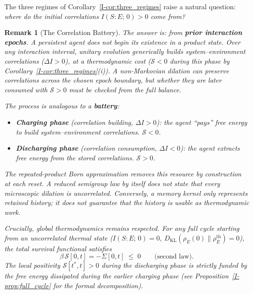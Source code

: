 \documentclass[12pt,a4paper,openany]{book}
\newtheorem{remark}[theorem]{Remark}
\begin{document}
The three regimes of Corollary~\ref{I-cor:three_regimes} raise a
natural question: \emph{where do the initial correlations
$I(S{:}E;\, 0) > 0$ come from?}

\begin{remark}[The Correlation Battery]
\label{I-rem:battery}
The answer is: from \textbf{prior interaction epochs}.
A persistent agent does not begin its existence in a product
state.
Over any interaction interval, unitary evolution generically
builds system--environment correlations ($\Delta I > 0$),
at a thermodynamic cost ($\mathcal{S} < 0$ during this
phase by Corollary~\ref{I-cor:three_regimes}(i)).
A non-Markovian dilation can preserve correlations across the chosen
epoch boundary, but whether they are later consumed with
$\mathcal S>0$ must be checked from the full balance.

The process is analogous to a \textbf{battery}:
\begin{itemize}
\item \textbf{Charging phase}
  (correlation building, $\Delta I > 0$):
  the agent ``pays'' free energy to build
  system--environment correlations.
  $\mathcal{S} < 0$.
\item \textbf{Discharging phase}
  (correlation consumption, $\Delta I < 0$):
  the agent extracts free energy from the stored
  correlations.
  $\mathcal{S} > 0$.
\end{itemize}
The repeated-product Born approximation removes this resource by
construction at each reset.  A reduced semigroup law by itself does not
state that every microscopic dilation is uncorrelated.  Conversely, a
memory kernel only represents retained history; it does not guarantee
that the history is usable as thermodynamic work.

Crucially, global thermodynamics remains respected.
For any full cycle starting from an uncorrelated thermal
state ($I(S{:}E;\,0) = 0$,
$D_{\mathrm{KL}}(\rho_E(0)\|\rho_E^{\mathrm{th}}) = 0$),
the total survival functional satisfies
\begin{equation}
\label{I-eq:battery_closure}
\beta\,\mathcal{S}[0, t]
= -\Sigma[0, t] \;\leq\; 0
\qquad\text{(second law).}
\end{equation}
The local positivity $\mathcal{S}[t^*, t] > 0$ during the
discharging phase is strictly funded by the free energy
dissipated during the earlier charging phase
(see Proposition~\ref{I-prop:full_cycle} for the formal
decomposition).
\end{remark}
\end{document}

